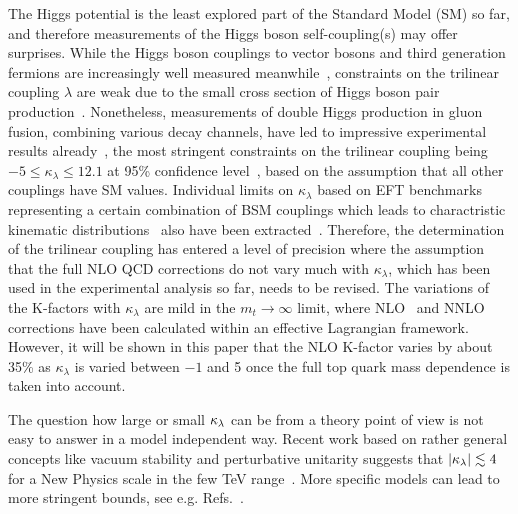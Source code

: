 The Higgs potential is the least explored part of the Standard Model (SM) so far, and therefore measurements of the Higgs boson self-coupling(s) may offer surprises.
While the Higgs boson couplings to vector bosons and third generation fermions are increasingly well measured meanwhile~\cite{Khachatryan:2016vau,Aaboud:2017vzb,ATLAS:2018doi,Sirunyan:2018koj,Sirunyan:2018sgc}, constraints on the trilinear coupling $\lambda$ are weak due to the small cross section of Higgs boson pair production~\cite{Glover:1987nx,Dawson:1998py,Baglio:2012np,Frederix:2014hta,Borowka:2016ehy,Borowka:2016ypz,Baglio:2018lrj}.
Nonetheless, measurements of double Higgs production in gluon fusion, combining various decay channels,  have led to impressive experimental results already~\cite{Sirunyan:2018two,Sirunyan:2018iwt,ATLAS-CONF-2018-043,Aaboud:2018ftw}, 
the most stringent constraints on the trilinear coupling being $-5\leq \kappa_\lambda\leq 12.1$
 at 95\% confidence level~\cite{ATLAS-CONF-2018-043}, based on the assumption that all other couplings have SM values.
Individual limits on $\kappa_\lambda$ based on EFT benchmarks representing a certain combination of BSM couplings which leads to charactristic kinematic distributions~\cite{Carvalho:2015ttv,Carvalho:2016rys,Buchalla:2018yce} also have been extracted~\cite{Sirunyan:2018two,Sirunyan:2018iwt}.
Therefore, the determination of the trilinear coupling has entered a level of precision where the assumption that the full NLO QCD corrections do not vary much with $\kappa_\lambda$, which has been used in the experimental analysis so far, needs to be revised.
The variations of the K-factors with $\kappa_\lambda$ are mild in the $m_t\to \infty$ limit, where NLO~\cite{Grober:2015cwa,Grober:2017gut} and NNLO~\cite{deFlorian:2017qfk} corrections have been calculated within an effective Lagrangian framework.
However, it will be shown in this paper that the NLO K-factor varies by about 35\% as $\kappa_\lambda$ is varied between $-1$ and 5 once the full top quark mass dependence is taken into account. 

The question how large or small $\kappa_{\lambda}$ can be from a theory point of view is not easy to answer in a model independent way. 
Recent work based on rather general concepts like vacuum stability and perturbative unitarity suggests that $|\kappa_{\lambda}|\lesssim 4$ for a New Physics scale in the few TeV range~\cite{Falkowski:2019tft,Chang:2019vez,DiLuzio:2017tfn,DiVita:2017eyz}.
More specific models can lead to more stringent bounds, see e.g. Refs.~\cite{Braathen:2019pxr,Basler:2018dac,Babu:2018uik,Lewis:2017dme}.

